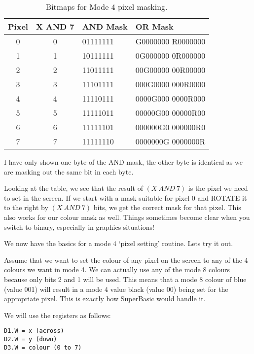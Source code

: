 \begin{table}[htbp]
\centering
\begin{tabular}{c c l l}
\toprule
\textbf{Pixel} & \textbf{X AND 7} & \textbf{AND Mask} & \textbf{OR Mask} \\
\midrule
%
0 & 0 & 01111111 & G0000000 R0000000 \\
1 & 1 & 10111111 & 0G000000 0R000000 \\
2 & 2 & 11011111 & 00G00000 00R00000 \\
3 & 3 & 11101111 & 000G0000 000R0000 \\
4 & 4 & 11110111 & 0000G000 0000R000 \\
5 & 5 & 11111011 & 00000G00 00000R00 \\
6 & 6 & 11111101 & 000000G0 000000R0 \\
7 & 7 & 11111110 & 0000000G 0000000R \\
%
\bottomrule
\end{tabular}
\caption{Bitmaps for Mode 4 pixel masking.}
\label{tab:BitmapsForMode4PixelMasking}
\end{table}

\begin{note}
I have only shown one byte of the AND mask, the other byte is
      identical as we are masking out the same bit in each byte.
\end{note}

Looking at the table, we see that the result of $(X~AND~7)$ is the
    pixel we need to set in the screen. If we start with a mask suitable for
    pixel 0 and ROTATE it to the right by $(X~AND~7)$ bits, we get the correct
    mask for that pixel. This also works for our colour mask as well. Things
    sometimes become clear when you switch to binary, especially in graphics
    situations!

We now have the basics for a mode 4 `pixel setting' routine. Lets
    try it out.

Assume that we want to set the colour of any pixel on the screen to
    any of the 4 colours we want in mode 4. We can actually use any of the
    mode 8 colours because only bits 2 and 1 will be used. This means that a
    mode 8 colour of blue (value 001) will result in a mode 4 value black
    (value 00) being set for the appropriate pixel. This is exactly how
    SuperBasic would handle it.

We will use the registers as follows:

\begin{lstlisting}[firstnumber=1,]
D1.W = x (across)
D2.W = y (down)
D3.W = colour (0 to 7)
\end{lstlisting}

